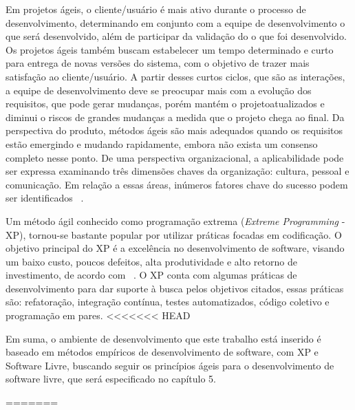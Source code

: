 Em projetos ágeis, o cliente/usuário é mais ativo durante o processo de desenvolvimento, 
determinando em conjunto com a equipe de desenvolvimento o que será desenvolvido, 
além de participar da validação do o que foi desenvolvido.
%
Os projetos ágeis também buscam estabelecer um 
tempo determinado e curto para entrega de novas versões do sistema, com o objetivo 
de trazer mais satisfação ao cliente/usuário.
%
A partir desses curtos ciclos, que são as interações, a equipe de desenvolvimento 
deve se preocupar mais com a evolução dos requisitos, que pode gerar mudanças, porém 
mantém o projetoatualizados e diminui o riscos de grandes mudanças a medida que o 
projeto chega ao final.
%
Da perspectiva do produto, métodos ágeis são mais adequados quando os requisitos 
estão emergindo e mudando rapidamente, embora não exista um consenso completo 
nesse ponto.
De uma perspectiva organizacional, a aplicabilidade pode ser expressa 
examinando três dimensões chaves da organização: cultura, pessoal e comunicação. 
Em relação a essas áreas, inúmeros fatores chave do sucesso podem ser identificados 
~\cite{cohen2004}.

Um método ágil conhecido como programação extrema (\emph{Extreme Programming} - XP), 
tornou-se bastante popular por utilizar práticas focadas em codificação.
%
O objetivo principal do XP é a excelência no desenvolvimento de software, visando 
um baixo custo, poucos defeitos, alta produtividade e alto retorno de investimento,
de acordo com ~. O XP conta com algumas práticas de desenvolvimento para dar suporte à busca pelos objetivos citados, essas práticas são: refatoração, integração contínua, testes automatizados, código coletivo e programação em pares.
<<<<<<< HEAD

Em suma, o ambiente de desenvolvimento que este trabalho está inserido é baseado em métodos empíricos de desenvolvimento de software, com XP e Software Livre, buscando seguir os princípios ágeis para o desenvolvimento de software livre, que será especificado no capítulo 5.

=======

